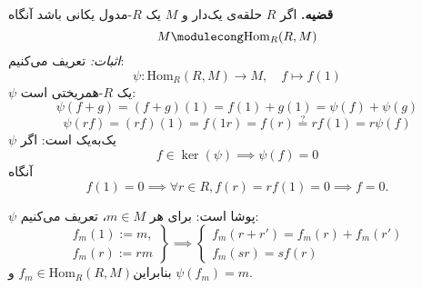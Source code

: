 \hrulefill

\textbf{قضیه.} اگر \( R \) حلقه‌ی یک‌دار و \( M \) یک \( R \)-مدول یکانی باشد آنگاه
\[
    M \modulecong \mathrm{Hom}_R(R, M)
\]
\textit{اثبات:} تعریف می‌کنیم:
\[
    \psi : \mathrm{Hom}_R(R, M) \to M, \quad f \mapsto f(1)
\]
\(\psi\) یک \( R \)-همریختی  است:
\[
    \psi(f+g) = (f+g)(1) = f(1) + g(1) = \psi(f) + \psi(g)
\]
\[
    \psi(rf) = (rf)(1) = f(1r) = f(r) \stackrel{?}{=} r f(1) = r \psi(f)
\]
\(\psi\) یک‌به‌یک است: اگر
\[
    f \in \ker(\psi) \implies\psi(f) = 0
\]
آنگاه
\[
    f(1) = 0 \implies \forall r \in R, f(r) = r f(1) = 0 \implies f=0.
\]


\(\psi\) پوشا است: برای هر \( m \in M \)، تعریف می‌کنیم:
\[
    \left.
    \begin{aligned}
        f_m(1) := m, \\
        f_m(r) := r m
    \end{aligned}
    \right\}
    \implies
    \begin{cases}
        f_m(r+r') = f_m(r) + f_m(r') \\
        f_m(sr) = sf(r)
    \end{cases}
\]
بنابراین\( f_m \in \mathrm{Hom}_R(R,M) \) و \(\psi(f_m) = m\).
